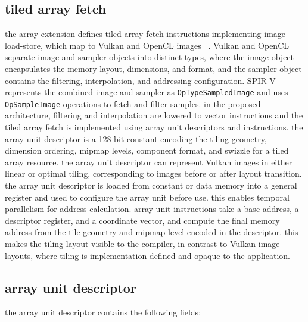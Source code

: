 \subsection{tiled array fetch}
the array extension defines tiled array fetch instructions implementing
image load-store, which map to Vulkan and OpenCL images%
~\cite{khronos-vulkan,khronos-opencl}.
Vulkan and OpenCL separate image and sampler objects into distinct types,
where the image object encapsulates the memory layout, dimensions, and
format, and the sampler object contains the filtering, interpolation,
and addressing configuration.
SPIR-V~\cite{khronos-spirv} represents the combined image and sampler
as \texttt{OpTypeSampledImage} and uses \texttt{OpSampleImage} operations
to fetch and filter samples.
\para
in the proposed architecture, filtering and interpolation are lowered
to vector instructions and the tiled array fetch is implemented using
array unit descriptors and instructions.
the array unit descriptor is a 128-bit constant encoding the tiling
geometry, dimension ordering, mipmap levels, component format, and
swizzle for a tiled array resource.
the array unit descriptor can represent Vulkan images in either linear or
optimal tiling, corresponding to images before or after layout transition.
\para
the array unit descriptor is loaded from constant or data memory into a
general register and used to configure the array unit before use.
this enables temporal parallelism for address calculation.
array unit instructions take a base address, a descriptor register, and
a coordinate vector, and compute the final memory address from the tile
geometry and mipmap level encoded in the descriptor. this makes the tiling
layout visible to the compiler, in contrast to Vulkan image layouts,
where tiling is implementation-defined and opaque to the application.

\newpage
\subsection{array unit descriptor}

the array unit descriptor contains the following fields:

